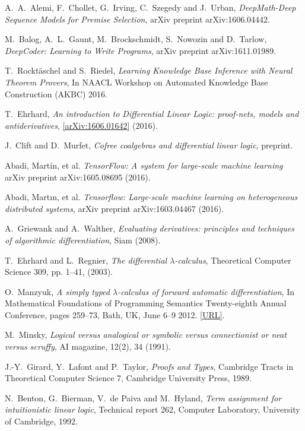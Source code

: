 \documentclass[english,letter paper,12pt,leqno]{article}
\theoremstyle{example}
\numberwithin{equation}{section}
\begin{document}
\begin{thebibliography}{BHLS03}
A.~A.~Alemi, F.~Chollet, G.~Irving, C.~Szegedy and J.~Urban, \textsl{DeepMath-Deep Sequence Models for Premise Selection}, arXiv preprint arXiv:1606.04442.

M.~Balog, A.~L.~Gaunt, M.~Brockschmidt, S.~Nowozin and D.~Tarlow, \textsl{DeepCoder: Learning to Write Programs}, arXiv preprint arXiv:1611.01989.

T.~Rockt\"aschel and S.~Riedel, \textsl{Learning Knowledge Base Inference with Neural Theorem Provers}, In NAACL Workshop on Automated Knowledge Base Construction (AKBC) 2016.

T.~Ehrhard, \textsl{An introduction to Differential Linear Logic: proof-nets, models and antiderivatives}, \href{https://arxiv.org/abs/1606.01642}{[arXiv:1606.01642]} (2016).

J.~Clift and D.~Murfet, \textsl{Cofree coalgebras and differential linear logic}, preprint.

Abadi, Martín, et al. \textsl{TensorFlow: A system for large-scale machine learning} arXiv preprint arXiv:1605.08695 (2016).

Abadi, Martın, et al. \textsl{Tensorflow: Large-scale machine learning on heterogeneous distributed systems}, arXiv preprint arXiv:1603.04467 (2016).

A.~Griewank and A.~Walther, \textsl{Evaluating derivatives: principles and techniques of algorithmic differentiation}, Siam (2008).

T.~Ehrhard and L.~Regnier, \textsl{The differential $\lambda$-calculus}, Theoretical Computer Science 309, pp. 1--41, (2003).

O.~Manzyuk, \textsl{A simply typed $\lambda$-calculus of forward automatic differentiation}, In Mathematical Foundations of Programming Semantics Twenty-eighth Annual Conference, pages 259--73, Bath, UK, June 6–9 2012. \href{http://dauns.math.tulane.edu/~mfps/mfps28proc.pdf}{[URL]}.

M.~Minsky, \textsl{Logical versus analogical or symbolic versus connectionist or neat versus scruffy}, AI magazine, 12(2), 34 (1991).

J.-Y.~Girard, Y.~Lafont and P.~Taylor, \textsl{Proofs and Types}, Cambridge Tracts in Theoretical Computer Science 7, Cambridge University Press, 1989.

N.~Benton, G.~Bierman, V.~de Paiva and M.~Hyland, \textsl{Term assignment for intuitionistic linear logic}, Technical report 262, Computer Laboratory, University of Cambridge, 1992.

\end{thebibliography}
\end{document}
